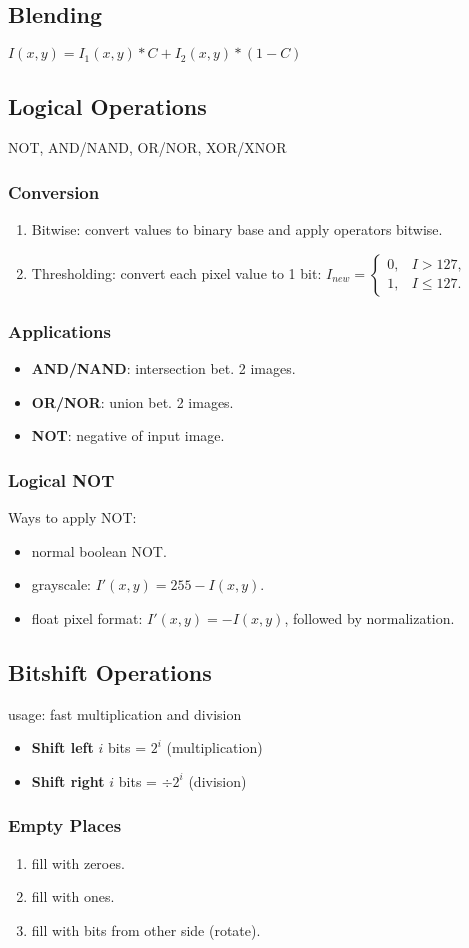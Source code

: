 \subsection{Blending}
$I(x,y) = I_1(x,y) * C +  I_2(x,y) * (1-C)$\\
\subsection{Logical Operations}
\textsc{NOT, AND/NAND, OR/NOR, XOR/XNOR}
\subsubsection{Conversion}
\begin{enumerate}
  \item Bitwise: convert values to binary base and apply operators bitwise.
  \item Thresholding: convert each pixel value to 1 bit:
$
  I_{new} =
  \begin{cases}
    0, & I > 127,\\
    1, & I \leq 127.
  \end{cases}
$
\end{enumerate}
\subsubsection{Applications}
\begin{itemize}
  \item \textbf{AND/NAND}: intersection bet. 2 images.
  \item \textbf{OR/NOR}: union bet. 2 images.
  \item \textbf{NOT}: negative of input image.
\end{itemize}
\subsubsection{Logical NOT}
Ways to apply NOT:
\begin{itemize}
  \item normal boolean NOT.
  \item grayscale: $I'(x,y) = 255 - I(x,y)$.
  \item float pixel format: $I'(x,y) = - I(x,y)$, followed by normalization.
\end{itemize}
\subsection{Bitshift Operations}
usage: fast multiplication and division
\begin{itemize}
  \item \textbf{Shift left} $i$ bits = $2^i$ (multiplication)
  \item \textbf{Shift right} $i$ bits = $\div 2^i$ (division)
\end{itemize}
\subsubsection{Empty Places}
\begin{enumerate}
  \item fill with zeroes.
  \item fill with ones.
  \item fill with bits from other side (rotate).
\end{enumerate}
